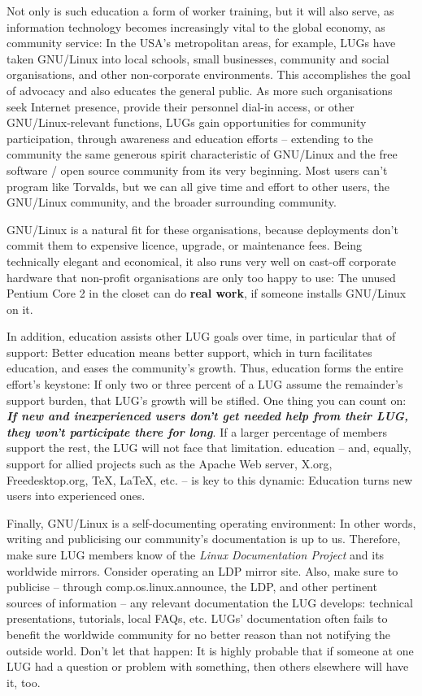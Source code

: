 \documentclass{HOWTO}
\begin{document}
Not only is such education a form of worker training, but it will also
serve, as information technology becomes increasingly vital to the
global economy, as community service: In the USA's metropolitan areas,
for example, LUGs have taken GNU/Linux into local schools, small businesses,
community and social organisations, and other non-corporate
environments. This accomplishes the goal of advocacy and also
educates the general public.  As more such organisations seek Internet
presence, provide their personnel dial-in access, or other
GNU/Linux-relevant functions, LUGs gain opportunities for community
participation, through awareness and education efforts -- extending to
the community the same generous spirit characteristic of GNU/Linux and the
free software / open source community from its very beginning. Most
users can't program like Torvalds, but we can all give time and
effort to other users, the GNU/Linux community, and the broader
surrounding community.

GNU/Linux is a natural fit for these organisations, because deployments
don't commit them to expensive licence, upgrade, or maintenance fees.
Being technically elegant and economical, it also runs very well on
cast-off corporate hardware that non-profit organisations are only too
happy to use: The unused Pentium Core 2 in the closet can do {\bfseries real
work}, if someone installs GNU/Linux on it.

In addition, education assists other LUG goals over time, in
particular that of support: Better education means better
support, which in turn facilitates education, and eases the 
community's growth.  Thus, education forms the entire effort's keystone:
If only two or three percent of a LUG assume the remainder's support
burden, that LUG's growth will be stifled. One thing you can count on:
{\bfseries {\itshape If new and inexperienced users don't get needed help
from their LUG, they won't participate there for long\/}}.
If a larger percentage of members support the rest, the LUG will not
face that limitation. education -- and, equally, support for
allied projects such as the Apache Web server, X.org, Freedesktop.org, 
TeX, LaTeX, etc.  -- is key to this dynamic: Education turns new users into
experienced ones.

Finally, GNU/Linux is a self-documenting operating environment: In other
words, writing and publicising our community's documentation is up to
us.  Therefore, make sure LUG members know of the 
\emph{Linux Documentation Project} \texttt{\acourl}
 and its worldwide
mirrors.  Consider operating an LDP mirror site.  Also, make sure to
publicise -- through {\ttfamily comp.os.linux.announce}, the LDP, and other
pertinent sources of information -- any relevant documentation the LUG
develops: technical presentations, tutorials, local FAQs, etc.  LUGs'
documentation often fails to benefit the worldwide community for no
better reason than not notifying the outside world.  Don't let that
happen:  It is highly probable that if someone at one LUG had a question
or problem with something, then others elsewhere will have it, too.
\end{document}
